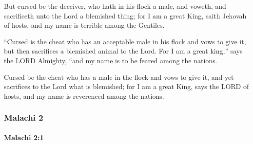 			\begin{versebox}
					\item[BHS] 
					\item[LXX] 
					\item[ASV] But cursed be the deceiver, who hath in his flock a male, and voweth, and sacrificeth unto the Lord a blemished thing; for I am a great King, saith Jehovah of hosts, and my name is terrible among the Gentiles.
					\item[NIV] “Cursed is the cheat who has an acceptable male in his flock and vows to give it, but then sacrifices a blemished animal to the Lord. For I am a great king,” says the LORD Almighty, “and my name is to be feared among the nations.
					\item[NRSV] Cursed be the cheat who has a male in the flock and vows to give it, and yet sacrifices to the Lord what is blemished; for I am a great King, says the LORD of hosts, and my name is reverenced among the nations.
			\end{versebox}
	\subsubsection{Malachi 2} %
		\label{MALACHI-2}

		\paragraph{Malachi 2:1} %
			\label{MALACHI-2-1}

